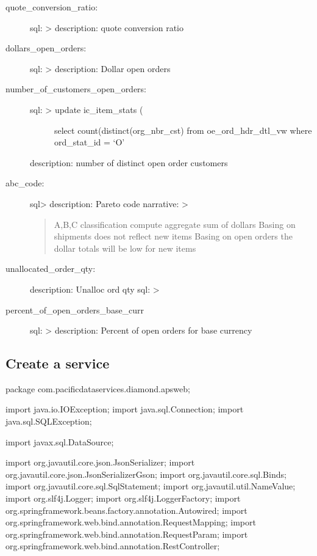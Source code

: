 \documentclass[letterpaper,10pt,english]{sphinxmanual}
\begin{document}
\begin{description}
\item[{quote\_conversion\_ratio:}] \leavevmode
sql: \textgreater{}
description: quote conversion ratio

\item[{dollars\_open\_orders:}] \leavevmode
sql: \textgreater{}
description: Dollar open orders

\item[{number\_of\_customers\_open\_orders:}] \leavevmode\begin{description}
\item[{sql: \textgreater{} update  ic\_item\_stats (}] \leavevmode
select count(distinct(org\_nbr\_cst)
from oe\_ord\_hdr\_dtl\_vw
where ord\_stat\_id = ‘O’

\end{description}

description: number of distinct open order customers

\item[{abc\_code:}] \leavevmode
sql\textgreater{}
description: Pareto code
narrative: \textgreater{}
\begin{quote}

A,B,C classification
compute aggregate sum of dollars
Basing on shipments does not reflect new items
Basing on open orders the dollar totals will be low for new items
\end{quote}

\item[{unallocated\_order\_qty:}] \leavevmode
description: Unalloc ord qty
sql: \textgreater{}

\item[{percent\_of\_open\_orders\_base\_curr}] \leavevmode
sql: \textgreater{}
description: Percent of open orders for base currency

\end{description}


\subsection{Create a service}
\label{\detokenize{IcItemStat:create-a-service}}
package com.pacificdataservices.diamond.apsweb;

import java.io.IOException;
import java.sql.Connection;
import java.sql.SQLException;

import javax.sql.DataSource;

import org.javautil.core.json.JsonSerializer;
import org.javautil.core.json.JsonSerializerGson;
import org.javautil.core.sql.Binds;
import org.javautil.core.sql.SqlStatement;
import org.javautil.util.NameValue;
import org.slf4j.Logger;
import org.slf4j.LoggerFactory;
import org.springframework.beans.factory.annotation.Autowired;
import org.springframework.web.bind.annotation.RequestMapping;
import org.springframework.web.bind.annotation.RequestParam;
import org.springframework.web.bind.annotation.RestController;
\end{document}
